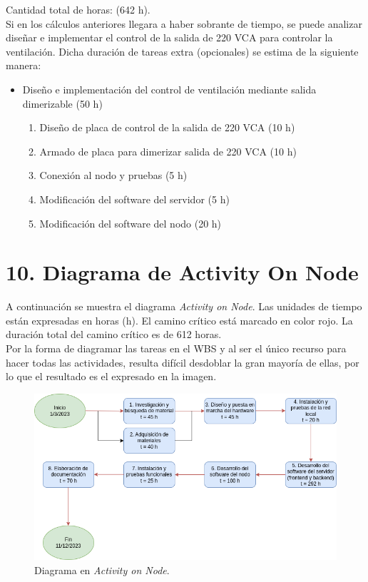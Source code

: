 \documentclass[
11pt, %
]{charter}
\begin{document}
Cantidad total de horas: (642 h). \\
Si en los cálculos anteriores llegara a haber sobrante de tiempo, se puede analizar diseñar e implementar el control de la salida de 220 VCA para controlar la ventilación. Dicha duración de tareas extra (opcionales) se estima de la siguiente manera:
\begin{itemize}

\item Diseño e implementación del control de ventilación mediante salida dimerizable (50 h)
	\begin{enumerate}
		\item Diseño de placa de control de la salida de 220 VCA (10 h)
		\item Armado de placa para dimerizar salida de 220 VCA (10 h)
		\item Conexión al nodo y pruebas (5 h)
		\item Modificación del software del servidor (5 h)
		\item Modificación del software del nodo (20 h)
	\end{enumerate}
\end{itemize}

\section{10. Diagrama de Activity On Node}
\label{sec:AoN}

A continuación se muestra el diagrama \textit{Activity on Node}. Las unidades de tiempo están expresadas en horas (h). El camino crítico está marcado en color rojo. La duración total del camino crítico es de 612 horas.\\
Por la forma de diagramar las tareas en el WBS y al ser el único recurso para hacer todas las actividades, resulta difícil desdoblar la gran mayoría de ellas, por lo que el resultado es el expresado en la imagen.

\begin{figure}[htpb]
\centering 
\includegraphics[width=.8\textwidth]{./Figuras/AoN.png}
\caption{Diagrama en \textit{Activity on Node}.}
\label{fig:AoN}
\end{figure}
\end{document}
